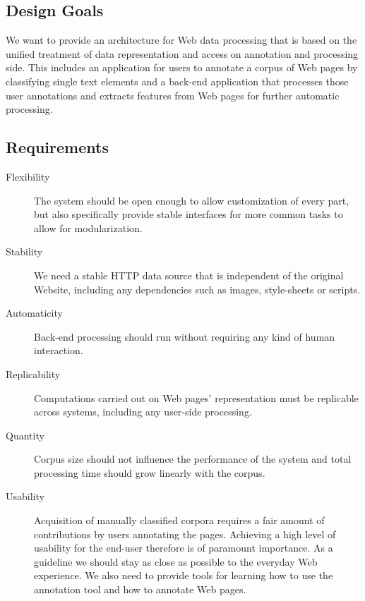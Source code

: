 \subsection{Design Goals}

We want to provide an architecture for Web data processing that is based on the unified treatment of data representation and access on annotation and processing side.
This includes an application for users to annotate a corpus of Web pages by classifying single text elements and
a back-end application that processes those user annotations and extracts features from Web pages for further automatic processing. 

\subsection{Requirements}

\begin{description}

\item[Flexibility]
The system should be open enough to allow customization of every part, but also specifically provide stable interfaces for more common tasks to allow for modularization.

\item[Stability]
We need a stable HTTP data source that is independent of the original Website, including any dependencies such as images, style-sheets or scripts.

\item[Automaticity]
Back-end processing should run without requiring any kind of human interaction.

\item[Replicability]
Computations carried out on Web pages' representation must be replicable across systems, including any user-side processing.

\item[Quantity]
Corpus size should not influence the performance of the system and total processing time should grow linearly with the corpus.

\item[Usability]
Acquisition of manually classified corpora requires a fair amount of contributions by users annotating the pages.
Achieving a high level of usability for the end-user therefore is of paramount importance.
As a guideline we should stay as close as possible to the everyday Web experience.
We also need to provide tools for learning how to use the annotation tool and how to annotate Web pages.

\end{description}

